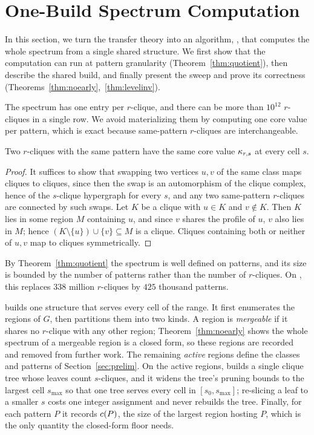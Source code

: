 \section{One-Build Spectrum Computation}
\label{sec:algo}

In this section, we turn the transfer theory into an algorithm, \specnd, that computes the whole spectrum from a single shared structure.
%
We first show that the computation can run at pattern granularity (Theorem~\ref{thm:quotient}), then describe the shared build, and finally present the sweep and prove its correctness (Theorems~\ref{thm:noearly},~\ref{thm:levelinv}).

The spectrum has one entry per $r$-clique, and there can be more than $10^{12}$ $r$-cliques in a single row.
%
We avoid materializing them by computing one core value per pattern, which is exact because same-pattern $r$-cliques are interchangeable.

\begin{theorem}
\label{thm:quotient}
Two $r$-cliques with the same pattern have the same core value $\kappa_{r,s}$ at every cell $s$.
\end{theorem}
\begin{proof}
It suffices to show that swapping two vertices $u,v$ of the same class maps cliques to cliques, since then the swap is an automorphism of the clique complex, hence of the $s$-clique hypergraph for every $s$, and any two same-pattern $r$-cliques are connected by such swaps.
%
Let $K$ be a clique with $u\in K$ and $v\notin K$.
%
Then $K$ lies in some region $M$ containing $u$, and since $v$ shares the profile of $u$, $v$ also lies in $M$; hence $(K\setminus\{u\})\cup\{v\}\subseteq M$ is a clique.
%
Cliques containing both or neither of $u,v$ map to cliques symmetrically.
\end{proof}

By Theorem~\ref{thm:quotient} the spectrum is well defined on patterns, and its size is bounded by the number of patterns rather than the number of $r$-cliques.
%
On \daWIT, this replaces $338$ million $r$-cliques by $425$ thousand patterns.

\specnd{} builds one structure that serves every cell of the range.
%
It first enumerates the regions of $G$, then partitions them into two kinds.
%
A region is \textit{mergeable} if it shares no $r$-clique with any other region; Theorem~\ref{thm:noearly} shows the whole spectrum of a mergeable region is a closed form, so these regions are recorded and removed from further work.
%
The remaining \textit{active} regions define the classes and patterns of Section~\ref{sec:prelim}.
%
On the active regions, \specnd{} builds a single clique tree whose leaves count $s$-cliques, and it widens the tree's pruning bounds to the largest cell $s_{\max}$ so that one tree serves every cell in $[s_0,s_{\max}]$; re-slicing a leaf to a smaller $s$ costs one integer assignment and never rebuilds the tree.
%
Finally, for each pattern $P$ it records $c(P)$, the size of the largest region hosting $P$, which is the only quantity the closed-form floor needs.


